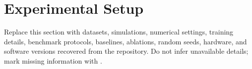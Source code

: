 \section{Experimental Setup}
\label{sec:experiments}

Replace this section with datasets, simulations, numerical settings, training details, benchmark protocols, baselines, ablations, random seeds, hardware, and software versions recovered from the repository. Do not infer unavailable details; mark missing information with .
